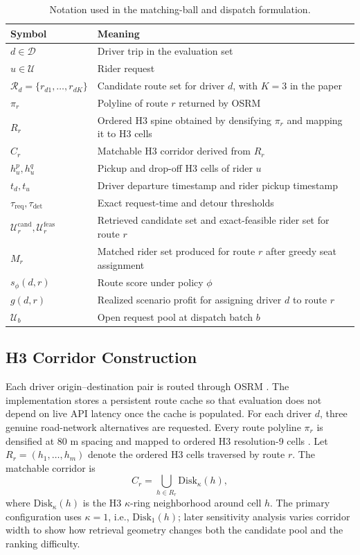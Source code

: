 \documentclass[journal]{IEEEtran}
\begin{document}
\begin{table}[!t]
\caption{Notation used in the matching-ball and dispatch formulation.}
\label{tab:notation}
\centering
\footnotesize
\begin{tabularx}{\columnwidth}{L{0.30\columnwidth}Y}
\toprule
Symbol & Meaning \\
\midrule
\(d \in \mathcal{D}\) & Driver trip in the evaluation set \\
\(u \in \mathcal{U}\) & Rider request \\
\(\mathcal{R}_d=\{r_{d1},\dots,r_{dK}\}\) & Candidate route set for driver \(d\), with \(K=3\) in the paper \\
\(\pi_r\) & Polyline of route \(r\) returned by OSRM \\
\(R_r\) & Ordered H3 spine obtained by densifying \(\pi_r\) and mapping it to H3 cells \\
\(C_r\) & Matchable H3 corridor derived from \(R_r\) \\
\(h_u^{p}, h_u^{q}\) & Pickup and drop-off H3 cells of rider \(u\) \\
\(t_d, t_u\) & Driver departure timestamp and rider pickup timestamp \\
\(\tau_{\mathrm{req}}, \tau_{\mathrm{det}}\) & Exact request-time and detour thresholds \\
\(\mathcal{U}_r^{\mathrm{cand}}, \mathcal{U}_r^{\mathrm{feas}}\) & Retrieved candidate set and exact-feasible rider set for route \(r\) \\
\(M_r\) & Matched rider set produced for route \(r\) after greedy seat assignment \\
\(s_\phi(d,r)\) & Route score under policy \(\phi\) \\
\(g(d,r)\) & Realized scenario profit for assigning driver \(d\) to route \(r\) \\
\(\mathcal{U}_b\) & Open request pool at dispatch batch \(b\) \\
\bottomrule
\end{tabularx}
\end{table}

\subsection{H3 Corridor Construction}
Each driver origin--destination pair is routed through OSRM \cite{osrmapi}. The implementation stores a persistent route cache so that evaluation does not depend on live API latency once the cache is populated. For each driver \(d\), three genuine road-network alternatives are requested. Every route polyline \(\pi_r\) is densified at 80 m spacing and mapped to ordered H3 resolution-9 cells \cite{h3docs}. Let \(R_r=(h_1,\dots,h_m)\) denote the ordered H3 cells traversed by route \(r\). The matchable corridor is
\[
C_r=\bigcup_{h\in R_r}\mathrm{Disk}_{\kappa}(h),
\]
where \(\mathrm{Disk}_{\kappa}(h)\) is the H3 \(\kappa\)-ring neighborhood around cell \(h\). The primary configuration uses \(\kappa=1\), i.e., \(\mathrm{Disk}_1(h)\); later sensitivity analysis varies corridor width to show how retrieval geometry changes both the candidate pool and the ranking difficulty.
\end{document}
